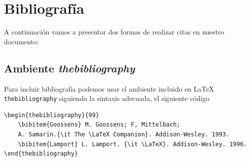 \documentclass[a4,10pt]{aleph-notas}
\begin{document}





\section{Bibliografía}

A continuación vamos a presentar dos formas de realizar citas en nuestro documento:

\subsection{Ambiente \emph{thebibliography}}

Para incluir bibliografía podemos usar el ambiente incluido en \LaTeX{} \texttt{thebibliography} siguiendo la sintaxis adecuada, el siguiente código

\begin{lstlisting}[frame=single]
\begin{thebibliography}{99}
    \bibitem{Goossens} M. Goossens; F, Mittelbach; 
    A. Samarin.{\it The \LaTeX Companion}. Addison-Wesley. 1993.
    \bibitem{Lamport} L. Lamport. {\it \LaTeX}. Addison-Wesley. 1996.
\end{thebibliography}
\end{lstlisting}
\end{document}
